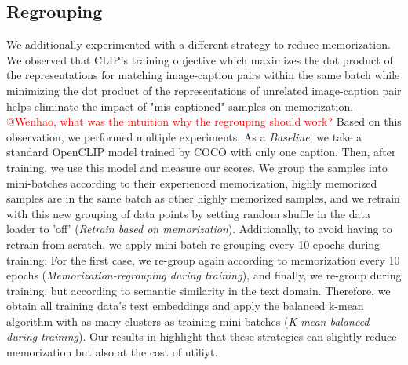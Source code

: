 \subsection{Regrouping}
\begin{table}[t]
          \caption{\textbf{Experiment for applying regrouping during training.} For each 10 epoch (out of 100), we regrouping all samples into batches according their pairwise cos-similarities. Inside each batch, the representation of samples' caption are as similar to each other as possible.}        
          \label{tab:reduce_memorization}
    \centering
    \scriptsize
\end{table}
We additionally experimented with a different strategy to reduce memorization.
We observed that CLIP's training objective which maximizes the dot product of the representations for matching image-caption pairs within the same batch while minimizing the dot product of the representations of unrelated image-caption pair helps eliminate the impact of "mis-captioned" samples on memorization.
\textcolor{red}{@Wenhao, what was the intuition why the regrouping should work?}
Based on this observation, we performed multiple experiments.
As a \textit{Baseline}, we take a standard OpenCLIP model trained by COCO with only one caption.
Then, after training, we use this model and measure our \ours scores. 
We group the samples into mini-batches according to their experienced memorization, \ie highly memorized samples are in the same batch as other highly memorized samples, and we retrain with this new grouping of data points by setting random shuffle in the data loader to 'off' (\textit{Retrain based on memorization}). 
Additionally, to avoid having to retrain from scratch, we apply mini-batch re-grouping every 10 epochs during training:
For the first case, we re-group again according to memorization every 10 epochs (\textit{Memorization-regrouping during training}), and finally, we re-group during training, but according to semantic similarity in the text domain.
Therefore, we obtain all training data's text embeddings and apply the balanced k-mean algorithm with as many clusters as training mini-batches (\textit{K-mean balanced during training}).
Our results in  highlight that these strategies can slightly reduce memorization but also at the cost of utiliyt.
